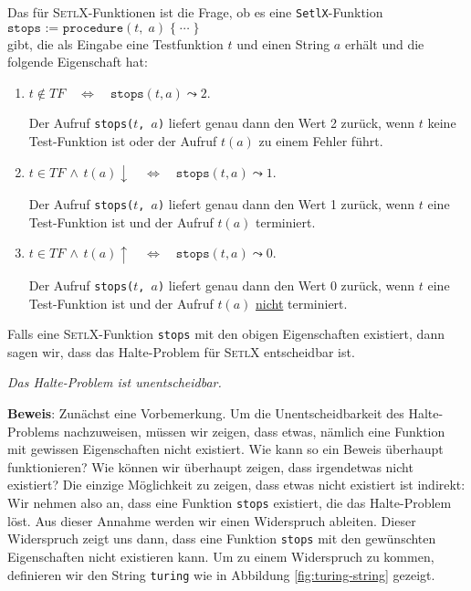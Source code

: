 \noindent
Das  für
\textsc{SetlX}-Funktionen ist die Frage, ob es eine \texttt{SetlX}-Funktion \\[0.1cm] 
\hspace*{1.3cm} 
$\texttt{stops := procedure}(t,\;a)\; \{\;\cdots\;\}$ \\[0.1cm]
gibt, die als Eingabe eine Testfunktion $t$ und einen String $a$ erhält und die folgende
Eigenschaft hat:
\begin{enumerate}
\item $t \not\in T\!F \quad\Leftrightarrow\quad \mathtt{stops}(t, a) \leadsto 2$.

      Der Aufruf \texttt{stops($t$, $a$)} liefert genau dann den Wert 2 zurück, 
      wenn $t$ keine Test-Funktion ist oder der Aufruf $t(a)$ zu einem Fehler führt.

\item $t \in T\!F \,\wedge\, t(a)\downarrow \quad\Leftrightarrow\quad
       \mathtt{stops}(t, a) \leadsto 1$.

      Der Aufruf \texttt{stops($t$, $a$)} liefert genau dann den Wert 1 zurück,
      wenn $t$ eine Test-Funktion ist und der Aufruf $t(a)$ terminiert.

\item $t \in T\!F \,\wedge\, t(a)\uparrow \quad\Leftrightarrow\quad
       \mathtt{stops}(t, a) \leadsto 0$.

      Der Aufruf \texttt{stops($t$, $a$)} liefert genau dann den Wert 0 zurück,
      wenn $t$ eine Test-Funktion ist und der Aufruf $t(a)$ \underline{nicht} terminiert.
\end{enumerate}
Falls eine \textsc{SetlX}-Funktion \texttt{stops} mit den obigen Eigenschaften existiert, dann
sagen wir, dass das Halte-Problem für \textsc{SetlX} entscheidbar ist.

\begin{Theorem}
{\em
  Das Halte-Problem ist unentscheidbar.
} 
\end{Theorem}

\noindent
\textbf{Beweis}:  Zunächst eine Vorbemerkung.  Um die Unentscheidbarkeit des
Halte-Problems nachzuweisen, müssen wir zeigen, dass etwas, nämlich eine Funktion mit
gewissen Eigenschaften nicht existiert.  Wie kann so ein Beweis überhaupt funktionieren?
Wie können wir überhaupt zeigen, dass irgendetwas nicht existiert?
Die einzige Möglichkeit zu zeigen, dass etwas nicht existiert ist indirekt:
Wir nehmen also an, dass eine Funktion \texttt{stops} existiert, die das Halte-Problem löst.
Aus dieser Annahme werden wir einen Widerspruch ableiten.  Dieser Widerspruch zeigt
uns dann, dass eine Funktion \texttt{stops} mit den gewünschten Eigenschaften nicht
existieren kann.
Um zu einem Widerspruch zu kommen, definieren wir den String \texttt{turing} wie in Abbildung
\ref{fig:turing-string} gezeigt.

